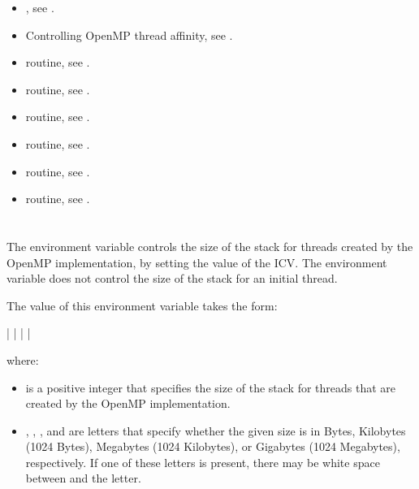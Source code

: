 \crossreferences
\begin{itemize}
\item {}, see .

\item Controlling OpenMP thread affinity, 
see .

\item {} routine, see .

\item {} routine, 
see .

\item {} routine, 
see .

\item {} routine, see .

\item {} routine, 
see .

\item {} routine, 
see .
\end{itemize}



\section{}
\label{sec:OMP_STACKSIZE}
The  environment variable controls the size of the 
stack for threads created by the OpenMP implementation, by setting the 
value of the  ICV. The environment variable does not 
control the size of the stack for an initial thread.

The value of this environment variable takes the form:

 |  |  |  | 

where:

\begin{itemize}
\item {} is a positive integer that specifies the size of the 
      stack for threads that are created by the OpenMP implementation.
\item {}, , , and  are letters that specify
      whether the given size is in Bytes, Kilobytes (1024 Bytes), Megabytes 
      (1024 Kilobytes), or Gigabytes (1024 Megabytes), respectively. If 
      one of these letters is present, there may be white space between
       and the letter.
\end{itemize}

